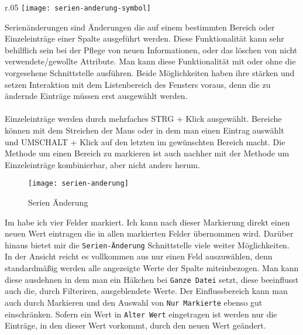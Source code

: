 \begin{wrapfigure}{r}{.05\textwidth}
	\vspace{-50pt}
	\texttt{[image: serien-anderung-symbol]}
	\vspace{-35pt}
\end{wrapfigure}

\noindent
Serienänderungen sind Änderungen die auf einem bestimmten Bereich oder Einzeleinträge einer Spalte ausgeführt werden. Diese Funktionalität kann sehr behilflich sein bei der Pflege von neuen Informationen, oder das löschen von nicht verwendete/gewollte Attribute. Man kann diese Funktionalität mit oder ohne die vorgesehene Schnittstelle ausführen. Beide Möglichkeiten haben ihre stärken und setzen Interaktion mit dem Listenbereich des Fensters voraus, denn die zu ändernde Einträge müssen erst ausgewählt werden.\\
\\
Einzeleinträge werden durch mehrfaches STRG + Klick ausgewählt. Bereiche können mit dem Streichen der Maus oder in dem man einen Eintrag auswählt und UMSCHALT + Klick auf den letzten im gewünschten Bereich macht. Die Methode um einen Bereich zu markieren ist auch nachher mit der Methode um Einzeleinträge kombinierbar, aber nicht anders herum.\\

\begin{figure}[h]
	\texttt{[image: serien-anderung]}
	\vspace{-15pt}
	\caption{Serien Änderung}
	\label{fig:serien-anderung}
\end{figure}

\noindent
Im  habe ich vier Felder markiert. Ich kann nach dieser Markierung direkt einen neuen Wert eintragen die in allen markierten Felder übernommen wird. Darüber hinaus bietet mir die \texttt{Serien-Änderung} Schnittstelle viele weiter Möglichkeiten. In der Ansicht reicht es vollkommen aus nur einen Feld auszuwählen, denn standardmäßig werden alle angezeigte Werte der Spalte miteinbezogen. Man kann diese ausdehnen in dem man ein Häkchen bei \texttt{Ganze Datei} setzt, diese beeinflusst auch die, durch Filteriren, ausgeblendete Werte. Der Einflussbereich kann man auch durch Markieren und den Auswahl von \texttt{Nur Markierte} ebenso gut einschränken. Sofern ein Wert in \texttt{Alter Wert} eingetragen ist werden nur die Einträge, in den dieser Wert vorkommt, durch den neuen Wert geändert. 

\newpage

